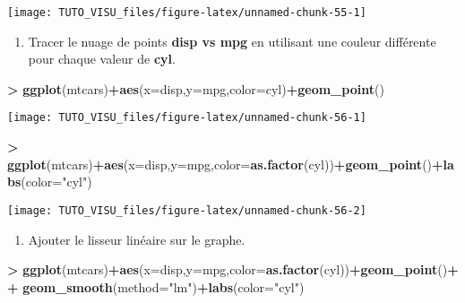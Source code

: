 \documentclass[]{article}
\newenvironment{Shaded}{\begin{snugshade}}{\end{snugshade}}
\newcommand{\DataTypeTok}[1]{\textcolor[rgb]{0.13,0.29,0.53}{#1}}
\newcommand{\KeywordTok}[1]{\textcolor[rgb]{0.13,0.29,0.53}{\textbf{#1}}}
\newcommand{\NormalTok}[1]{#1}
\newcommand{\OperatorTok}[1]{\textcolor[rgb]{0.81,0.36,0.00}{\textbf{#1}}}
\newcommand{\StringTok}[1]{\textcolor[rgb]{0.31,0.60,0.02}{#1}}
\providecommand{\tightlist}{%
  \setlength{\itemsep}{0pt}\setlength{\parskip}{0pt}}
\theoremstyle{definition}
\theoremstyle{definition}
\theoremstyle{definition}
\theoremstyle{remark}
\begin{document}
\begin{center}\texttt{[image: TUTO\_VISU\_files/figure-latex/unnamed-chunk-55-1]} \end{center}

\begin{enumerate}
\def\labelenumi{\arabic{enumi}.}
\setcounter{enumi}{3}
\tightlist
\item
  Tracer le nuage de points \textbf{disp vs mpg} en utilisant une couleur différente pour chaque valeur de \textbf{cyl}.
\end{enumerate}

\begin{Shaded}
\begin{Highlighting}[]
\OperatorTok{>}\StringTok{ }\KeywordTok{ggplot}\NormalTok{(mtcars)}\OperatorTok{+}\KeywordTok{aes}\NormalTok{(}\DataTypeTok{x=}\NormalTok{disp,}\DataTypeTok{y=}\NormalTok{mpg,}\DataTypeTok{color=}\NormalTok{cyl)}\OperatorTok{+}\KeywordTok{geom_point}\NormalTok{()}
\end{Highlighting}
\end{Shaded}

\begin{center}\texttt{[image: TUTO\_VISU\_files/figure-latex/unnamed-chunk-56-1]} \end{center}

\begin{Shaded}
\begin{Highlighting}[]
\OperatorTok{>}\StringTok{ }\KeywordTok{ggplot}\NormalTok{(mtcars)}\OperatorTok{+}\KeywordTok{aes}\NormalTok{(}\DataTypeTok{x=}\NormalTok{disp,}\DataTypeTok{y=}\NormalTok{mpg,}\DataTypeTok{color=}\KeywordTok{as.factor}\NormalTok{(cyl))}\OperatorTok{+}\KeywordTok{geom_point}\NormalTok{()}\OperatorTok{+}\KeywordTok{labs}\NormalTok{(}\DataTypeTok{color=}\StringTok{"cyl"}\NormalTok{)}
\end{Highlighting}
\end{Shaded}

\begin{center}\texttt{[image: TUTO\_VISU\_files/figure-latex/unnamed-chunk-56-2]} \end{center}

\begin{enumerate}
\def\labelenumi{\arabic{enumi}.}
\setcounter{enumi}{4}
\tightlist
\item
  Ajouter le lisseur linéaire sur le graphe.
\end{enumerate}

\begin{Shaded}
\begin{Highlighting}[]
\OperatorTok{>}\StringTok{ }\KeywordTok{ggplot}\NormalTok{(mtcars)}\OperatorTok{+}\KeywordTok{aes}\NormalTok{(}\DataTypeTok{x=}\NormalTok{disp,}\DataTypeTok{y=}\NormalTok{mpg,}\DataTypeTok{color=}\KeywordTok{as.factor}\NormalTok{(cyl))}\OperatorTok{+}\KeywordTok{geom_point}\NormalTok{()}\OperatorTok{+}
\OperatorTok{+}\StringTok{   }\KeywordTok{geom_smooth}\NormalTok{(}\DataTypeTok{method=}\StringTok{"lm"}\NormalTok{)}\OperatorTok{+}\KeywordTok{labs}\NormalTok{(}\DataTypeTok{color=}\StringTok{"cyl"}\NormalTok{)}
\end{Highlighting}
\end{Shaded}
\end{document}
